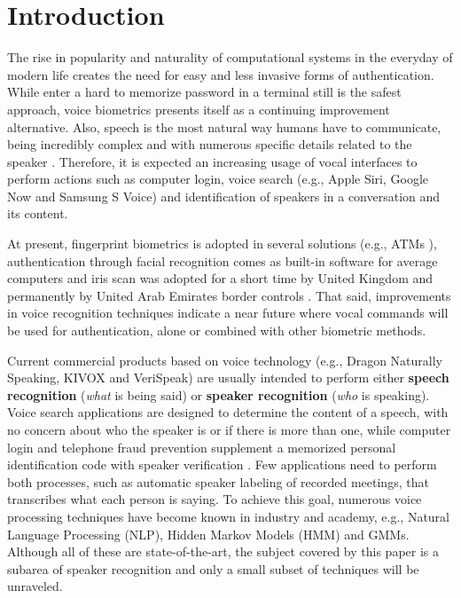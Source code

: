 \chapter{Introduction}

The rise in popularity and naturality of computational systems in the everyday of modern life creates the need for easy and less invasive forms of authentication. While enter a hard to memorize password in a terminal still is the safest approach, voice biometrics presents itself as a continuing improvement alternative. Also, speech is the most natural way humans have to communicate, being incredibly complex and with numerous specific details related to the speaker \cite{bimbot.et.al.2004}. Therefore, it is expected an increasing usage of vocal interfaces to perform actions such as computer login, voice search (e.g., Apple Siri, Google Now and Samsung S Voice) and identification of speakers in a conversation and its content.

At present, fingerprint biometrics is adopted in several solutions (e.g., ATMs \cite{wang.wu.2002}), authentication through facial recognition comes as built-in software for average computers and iris scan was adopted for a short time by United Kingdom and permanently by United Arab Emirates border controls \cite{sasse.2007, raisi.khouri.2008}. That said, improvements in voice recognition techniques indicate a near future where vocal commands will be used for authentication, alone or combined with other biometric methods.

Current commercial products based on voice technology (e.g., Dragon Naturally Speaking, KIVOX and VeriSpeak) are usually intended to perform either \textbf{speech recognition} (\emph{what} is being said) or \textbf{speaker recognition} (\emph{who} is speaking). Voice search applications are designed to determine the content of a speech, with no concern about who the speaker is or if there is more than one, while computer login and telephone fraud prevention supplement a memorized personal identification code with speaker verification \cite{reynolds.1995}. Few applications need to perform both processes, such as automatic speaker labeling of recorded meetings, that transcribes what each person is saying. To achieve this goal, numerous voice processing techniques have become known in industry and academy, e.g., Natural Language Processing (NLP), Hidden Markov Models (HMM) and GMMs. Although all of these are state-of-the-art, the subject covered by this paper is a subarea of speaker recognition and only a small subset of techniques will be unraveled.

